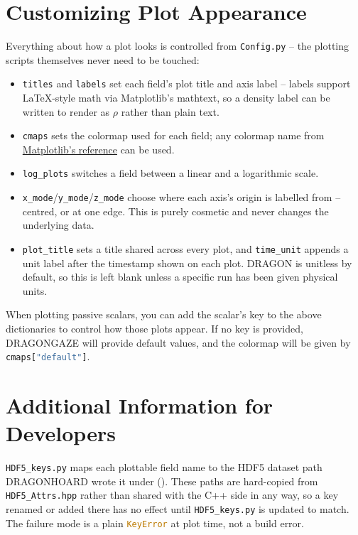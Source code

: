 \documentclass[11pt]{report}
\newcommand{\bash}[1]{\lstinline[language=bash]{#1}}
\newcommand{\py}[1]{\lstinline[language=Python]{#1}}
\begin{document}
\section{Customizing Plot Appearance}
\label{sec:gaze-appearance}

Everything about how a plot looks is controlled from \py{Config.py} -- the plotting scripts themselves never need to be touched:
\begin{itemize}
\item \py{titles} and \py{labels} set each field's plot title and axis label -- labels support LaTeX-style math via Matplotlib's mathtext, so a density label can be written to render as $\rho$ rather than plain text.
\item \py{cmaps} sets the colormap used for each field; any colormap name from \href{https://matplotlib.org/stable/gallery/color/colormap_reference.html}{Matplotlib's reference} can be used.
\item \py{log_plots} switches a field between a linear and a logarithmic scale.
\item \py{x_mode}/\py{y_mode}/\py{z_mode} choose where each axis's origin is labelled from -- centred, or at one edge. This is purely cosmetic and never changes the underlying data.
\item \py{plot_title} sets a title shared across every plot, and \py{time_unit} appends a unit label after the timestamp shown on each plot. DRAGON is unitless by default, so this is left blank unless a specific run has been given physical units.
\end{itemize}
When plotting passive scalars, you can add the scalar's key to the above dictionaries to control how those plots appear. If no key is provided, DRAGONGAZE will provide default values, and the colormap will be given by \py{cmaps["default"]}.

\section{Additional Information for Developers}
\label{sec:gaze-developers}

 \bash{HDF5_keys.py} maps each plottable field name to the HDF5 dataset path DRAGONHOARD wrote it under (). These paths are hard-copied from \bash{HDF5_Attrs.hpp} rather than shared with the C++ side in any way, so a key renamed or added there has no effect until \bash{HDF5_keys.py} is updated to match. The failure mode is a plain \py{KeyError} at plot time, not a build error.
 
\end{document}
